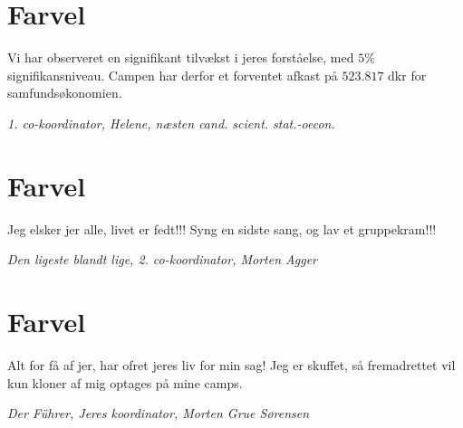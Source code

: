 \begin{minipage}[b]{0.95\linewidth}
\begin{minipage}[t]{0.47\textwidth}
%

\section*{Farvel}
Vi har observeret en signifikant tilvækst i jeres forståelse, med $5\%$ signifikansniveau. Campen har derfor et forventet afkast på $523.817$ dkr for samfundsøkonomien.

{\flushright\emph{1. co-koordinator, Helene, næsten cand. scient. stat.-oecon.}}

\section*{Farvel}
Jeg elsker jer alle, livet er fedt!!! Syng en sidste sang, og lav et gruppekram!!!

{\flushright\emph{Den ligeste blandt lige, 2. co-koordinator, Morten Agger}}

\section*{Farvel}
Alt for få af jer, har ofret jeres liv for min sag! Jeg er skuffet, så fremadrettet vil kun kloner af mig optages på mine camps. 

{\flushright\emph{Der Führer, Jeres koordinator, Morten Grue Sørensen}}


\end{minipage}
\end{minipage}
